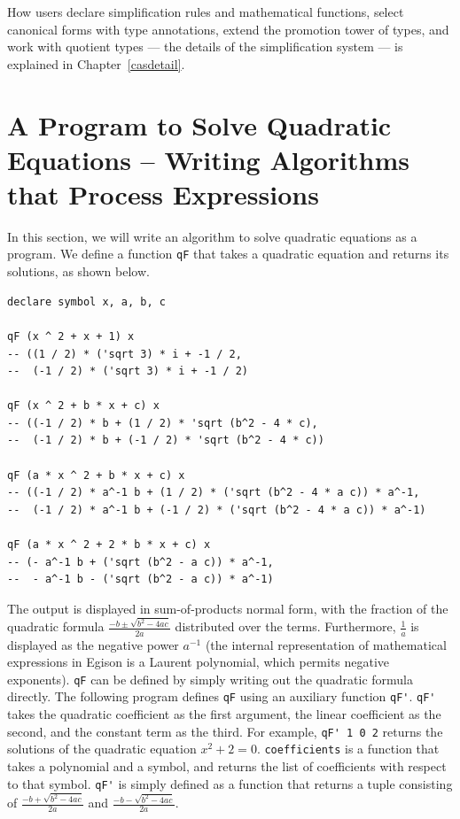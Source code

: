 How users declare simplification rules and mathematical functions, select canonical forms with type annotations, extend the promotion tower of types, and work with quotient types --- the details of the simplification system --- is explained in Chapter~\ref{casdetail}.

\section{A Program to Solve Quadratic Equations -- Writing Algorithms that Process Expressions}\label{cas-quadratic}

In this section, we will write an algorithm to solve quadratic equations as a program.
We define a function \lstinline{qF} that takes a quadratic equation and returns its solutions, as shown below.
\begin{lstlisting}[language=egison,numbers=none]
declare symbol x, a, b, c

qF (x ^ 2 + x + 1) x
-- ((1 / 2) * ('sqrt 3) * i + -1 / 2,
--  (-1 / 2) * ('sqrt 3) * i + -1 / 2)

qF (x ^ 2 + b * x + c) x
-- ((-1 / 2) * b + (1 / 2) * 'sqrt (b^2 - 4 * c),
--  (-1 / 2) * b + (-1 / 2) * 'sqrt (b^2 - 4 * c))

qF (a * x ^ 2 + b * x + c) x
-- ((-1 / 2) * a^-1 b + (1 / 2) * ('sqrt (b^2 - 4 * a c)) * a^-1,
--  (-1 / 2) * a^-1 b + (-1 / 2) * ('sqrt (b^2 - 4 * a c)) * a^-1)

qF (a * x ^ 2 + 2 * b * x + c) x
-- (- a^-1 b + ('sqrt (b^2 - a c)) * a^-1,
--  - a^-1 b - ('sqrt (b^2 - a c)) * a^-1)
\end{lstlisting}
The output is displayed in sum-of-products normal form, with the fraction of the quadratic formula $\frac{-b \pm \sqrt{b^2 - 4 a c}}{2 a}$ distributed over the terms.
Furthermore, $\frac{1}{a}$ is displayed as the negative power $a^{-1}$ (the internal representation of mathematical expressions in Egison is a Laurent polynomial, which permits negative exponents).
\lstinline{qF} can be defined by simply writing out the quadratic formula directly.
The following program defines \lstinline{qF} using an auxiliary function \lstinline{qF'}.
\lstinline{qF'} takes the quadratic coefficient as the first argument, the linear coefficient as the second, and the constant term as the third.
For example, \lstinline{qF' 1 0 2} returns the solutions of the quadratic equation $x^2 + 2 = 0$.
\lstinline{coefficients} is a function that takes a polynomial and a symbol, and returns the list of coefficients with respect to that symbol.
\lstinline{qF'} is simply defined as a function that returns a tuple consisting of $\frac{-b + \sqrt{b^2 - 4 a c}}{2 a}$ and $\frac{-b - \sqrt{b^2 - 4 a c}}{2 a}$.
